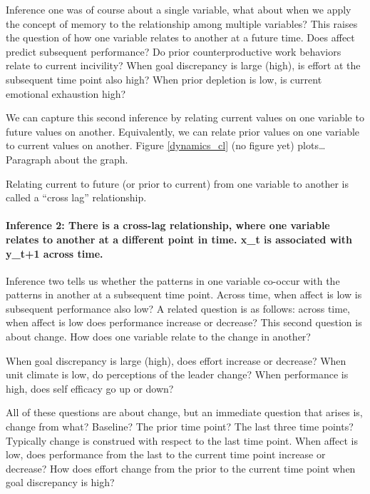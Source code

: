 \documentclass[english,,man]{apa6}
\let\oldparagraph\paragraph
\renewcommand{\paragraph}[1]{\oldparagraph{#1}\mbox{}}
\theoremstyle{definition}
\theoremstyle{definition}
\theoremstyle{definition}
\theoremstyle{remark}
\begin{document}
Inference one was of course about a single variable, what about when we
apply the concept of memory to the relationship among multiple
variables? This raises the question of how one variable relates to
another at a future time. Does affect predict subsequent performance? Do
prior counterproductive work behaviors relate to current incivility?
When goal discrepancy is large (high), is effort at the subsequent time
point also high? When prior depletion is low, is current emotional
exhaustion high?

We can capture this second inference by relating current values on one
variable to future values on another. Equivalently, we can relate prior
values on one variable to current values on another. Figure
\ref{dynamics_cl} (no figure yet) plots\ldots{}Paragraph about the
graph.

Relating current to future (or prior to current) from one variable to
another is called a \enquote{cross lag} relationship.

\hypertarget{inference-2-there-is-a-cross-lag-relationship-where-one-variable-relates-to-another-at-a-different-point-in-time.-x_t-is-associated-with-y_t1-across-time.}{%
\paragraph{Inference 2: There is a cross-lag relationship, where one
variable relates to another at a different point in time. x\_t is
associated with y\_t+1 across
time.}\label{inference-2-there-is-a-cross-lag-relationship-where-one-variable-relates-to-another-at-a-different-point-in-time.-x_t-is-associated-with-y_t1-across-time.}}

Inference two tells us whether the patterns in one variable co-occur
with the patterns in another at a subsequent time point. Across time,
when affect is low is subsequent performance also low? A related
question is as follows: across time, when affect is low does performance
increase or decrease? This second question is about change. How does one
variable relate to the change in another?

When goal discrepancy is large (high), does effort increase or decrease?
When unit climate is low, do perceptions of the leader change? When
performance is high, does self efficacy go up or down?

All of these questions are about change, but an immediate question that
arises is, change from what? Baseline? The prior time point? The last
three time points? Typically change is construed with respect to the
last time point. When affect is low, does performance from the last to
the current time point increase or decrease? How does effort change from
the prior to the current time point when goal discrepancy is high?
\end{document}
